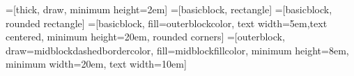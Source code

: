 

\usetikzlibrary{
  arrows,
  shapes.misc,
  shapes,
}

=[thick, draw, minimum height=2em]
=[basicblock, rectangle]
=[basicblock, rounded rectangle]
=[basicblock, fill=outerblockcolor, text width=5em,text centered, minimum height=20em, rounded corners]
=[outerblock, draw=midblockdashedbordercolor, fill=midblockfillcolor, minimum height=8em, minimum width=20em, text width=10em]